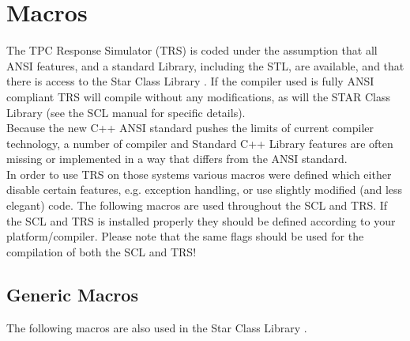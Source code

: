 \documentclass[twoside]{article}
\newcommand{\name}[1]{\textsf{#1}}%
\begin{document}
\section{Macros}  \label{Macros}

The \name{TPC Response Simulator (TRS)} is coded under the assumption that all
ANSI features, and a standard Library, including the STL, are available,
and that there is access to the 
Star Class Library . If the compiler used is fully ANSI
compliant \name{TRS} will compile without any modifications, as will the 
STAR Class Library (see the SCL manual for specific details).\\
Because the new C++ ANSI standard pushes the limits of current  
compiler technology, a number of compiler and Standard C++ 
Library 
features are often missing or implemented in a way that differs from
the ANSI standard.\\
In order to use TRS on those systems various macros were defined
which either disable certain features, e.g. exception handling, or use
slightly modified (and less elegant) code.
The following macros are used throughout the \name{SCL} and \name{TRS}.
If the \name{SCL} and \name{TRS} is installed properly they should be defined
according to your platform/compiler.  Please note that the same
flags should be used for the compilation of both the \name{SCL} and \name{TRS}!

\subsection{Generic Macros}

The following macros are also used in the  Star Class Library .
\end{document}

